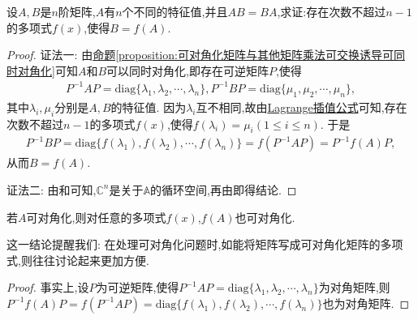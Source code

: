 \documentclass[../../main.tex]{subfiles}
\begin{document}
\begin{proposition}\label{proposition:有n个不同特征值的矩阵乘法可交换诱导多项式表示}
设$A,B$是$n$阶矩阵,$A$有$n$个不同的特征值,并且$AB = BA$,求证:存在次数不超过$n - 1$的多项式$f(x)$,使得$B = f(A)$.
\end{proposition}
\begin{proof}
{\color{blue}证法一:}
由\hyperref[proposition:可对角化矩阵与其他矩阵乘法可交换诱导可同时对角化]{命题\ref{proposition:可对角化矩阵与其他矩阵乘法可交换诱导可同时对角化}}可知$A$和$B$可以同时对角化,即存在可逆矩阵$P$,使得
\begin{align*}
P^{-1}AP=\mathrm{diag}\{\lambda_1,\lambda_2,\cdots,\lambda_n\}, P^{-1}BP=\mathrm{diag}\{\mu_1,\mu_2,\cdots,\mu_n\},
\end{align*}
其中$\lambda_i,\mu_i$分别是$A,B$的特征值. 因为$\lambda_i$互不相同,故由\hyperref[theorem:Lagrange插值公式]{Lagrange插值公式}可知,存在次数不超过$n - 1$的多项式$f(x)$,使得$f(\lambda_i)=\mu_i(1\leqslant  i\leqslant  n)$. 于是
\begin{align*}
P^{-1}BP=\mathrm{diag}\{f(\lambda_1),f(\lambda_2),\cdots,f(\lambda_n)\}=f(P^{-1}AP)=P^{-1}f(A)P,
\end{align*}
从而$B = f(A)$.

{\color{blue}证法二:}
由和可知,$\mathbb{C}^n$是关于$\mathbb{A}$的循环空间,再由即得结论.
\end{proof}

\begin{proposition}\label{proposition:矩阵A可对角化则f(A)也可对角化}
若$A$可对角化,则对任意的多项式$f(x)$,$f(A)$也可对角化.
\end{proposition}
\begin{note}
这一结论提醒我们: 在处理可对角化问题时,如能将矩阵写成可对角化矩阵的多项式,则往往讨论起来更加方便.
\end{note}
\begin{proof}
事实上,设$P$为可逆矩阵,使得$P^{-1}AP=\mathrm{diag}\{\lambda_1,\lambda_2,\cdots,\lambda_n\}$为对角矩阵,则$P^{-1}f(A)P=f(P^{-1}AP)=\mathrm{diag}\{f(\lambda_1),f(\lambda_2),\cdots,f(\lambda_n)\}$也为对角矩阵.
\end{proof}
\end{document}
